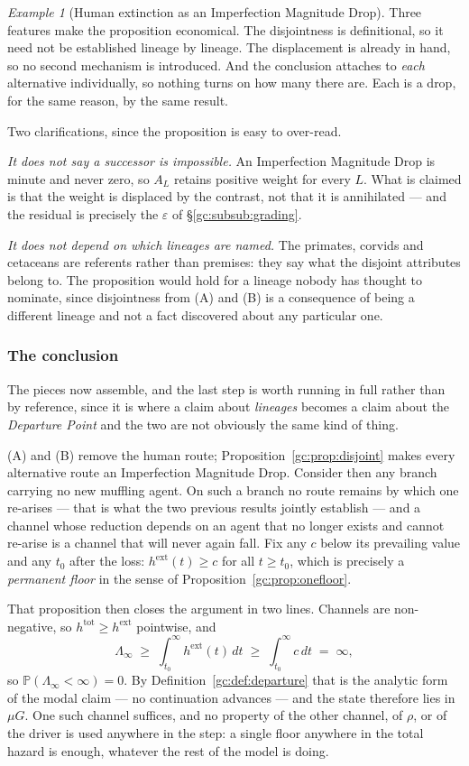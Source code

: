 \documentclass[11pt]{article}
\numberwithin{equation}{section}
\theoremstyle{plain}
\theoremstyle{definition}
\theoremstyle{remark}
\newtheorem{example}[theorem]{Example}
\newcommand{\PP}{\mathbb{P}}
\begin{document}
\begin{example}[Human extinction as an Imperfection Magnitude Drop]
Three features make the proposition economical. The disjointness is
definitional, so it need not be established lineage by lineage. The
displacement is already in hand, so no second mechanism is introduced.
And the conclusion attaches to \emph{each} alternative individually, so
nothing turns on how many there are. Each is a drop, for the same
reason, by the same result.

Two clarifications, since the proposition is easy to over-read.

\emph{It does not say a successor is impossible.} An Imperfection
Magnitude Drop is minute and never zero, so $A_L$ retains positive
weight for every $L$. What is claimed is that the weight is displaced
by the contrast, not that it is annihilated --- and the residual is
precisely the $\varepsilon$ of \S\ref{gc:subsub:grading}.

\emph{It does not depend on which lineages are named.} The primates,
corvids and cetaceans are referents rather than premises: they say what
the disjoint attributes belong to. The proposition would hold for a
lineage nobody has thought to nominate, since disjointness from (A) and
(B) is a consequence of being a different lineage and not a fact
discovered about any particular one.

\subsubsection{The conclusion}\label{gc:subsub:imdconclusion}

The pieces now assemble, and the last step is worth running in full
rather than by reference, since it is where a claim about \emph{lineages}
becomes a claim about the \emph{Departure Point} and the two are not
obviously the same kind of thing.

(A) and (B) remove the human route;
Proposition~\ref{gc:prop:disjoint} makes every alternative route an
Imperfection Magnitude Drop. Consider then any branch carrying no new
muffling agent. On such a branch no route remains by which one
re-arises --- that is what the two previous results jointly establish
--- and a channel whose reduction depends on an agent that no longer
exists and cannot re-arise is a channel that will never again fall.
Fix any $c$ below its prevailing value and any $t_0$ after the loss:
$h^{\mathrm{ext}}(t)\ge c$ for all $t\ge t_0$, which is precisely a
\emph{permanent floor} in the sense of
Proposition~\ref{gc:prop:onefloor}.

That proposition then closes the argument in two lines. Channels are
non-negative, so $h^{\mathrm{tot}}\ge h^{\mathrm{ext}}$ pointwise, and
\[
\Lambda_\infty\;\ge\;\int_{t_0}^{\infty}h^{\mathrm{ext}}(t)\,dt
\;\ge\;\int_{t_0}^{\infty}c\,dt\;=\;\infty ,
\]
so $\PP(\Lambda_\infty<\infty)=0$. By
Definition~\ref{gc:def:departure} that is the analytic form of the
modal claim --- no continuation advances --- and the state therefore
lies in $\mu G$. One such channel suffices, and no property of the
other channel, of $\rho$, or of the driver is used anywhere in the
step: a single floor anywhere in the total hazard is enough, whatever
the rest of the model is doing.


\end{example}
\end{document}
